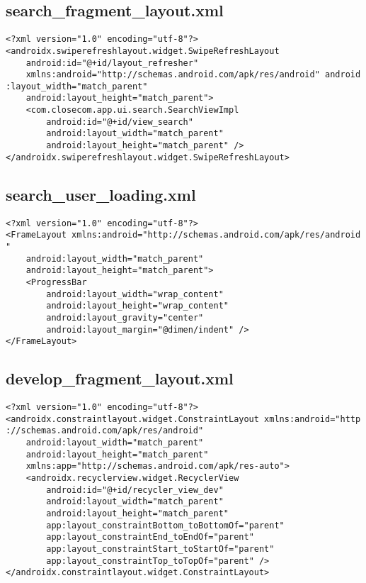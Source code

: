 \documentclass[listing]{espd}
\begin{document}
\subsection{search\_fragment\_layout.xml}
\begin{verbatim}
<?xml version="1.0" encoding="utf-8"?>
<androidx.swiperefreshlayout.widget.SwipeRefreshLayout
    android:id="@+id/layout_refresher"
    xmlns:android="http://schemas.android.com/apk/res/android" android
:layout_width="match_parent"
    android:layout_height="match_parent">
    <com.closecom.app.ui.search.SearchViewImpl
        android:id="@+id/view_search"
        android:layout_width="match_parent"
        android:layout_height="match_parent" />
</androidx.swiperefreshlayout.widget.SwipeRefreshLayout>
\end{verbatim}

\subsection{search\_user\_loading.xml}
\begin{verbatim}
<?xml version="1.0" encoding="utf-8"?>
<FrameLayout xmlns:android="http://schemas.android.com/apk/res/android
"
    android:layout_width="match_parent"
    android:layout_height="match_parent">
    <ProgressBar
        android:layout_width="wrap_content"
        android:layout_height="wrap_content"
        android:layout_gravity="center"
        android:layout_margin="@dimen/indent" />
</FrameLayout>
\end{verbatim}

\subsection{develop\_fragment\_layout.xml}
\begin{verbatim}
<?xml version="1.0" encoding="utf-8"?>
<androidx.constraintlayout.widget.ConstraintLayout xmlns:android="http
://schemas.android.com/apk/res/android"
    android:layout_width="match_parent"
    android:layout_height="match_parent"
    xmlns:app="http://schemas.android.com/apk/res-auto">
    <androidx.recyclerview.widget.RecyclerView
        android:id="@+id/recycler_view_dev"
        android:layout_width="match_parent"
        android:layout_height="match_parent"
        app:layout_constraintBottom_toBottomOf="parent"
        app:layout_constraintEnd_toEndOf="parent"
        app:layout_constraintStart_toStartOf="parent"
        app:layout_constraintTop_toTopOf="parent" />
</androidx.constraintlayout.widget.ConstraintLayout>
\end{verbatim}
\end{document}

